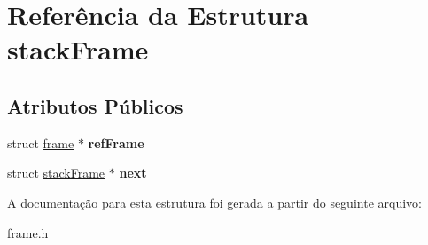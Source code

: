 \hypertarget{structstackFrame}{\section{Referência da Estrutura stack\-Frame}
\label{structstackFrame}
}
\subsection*{Atributos Públicos}
\begin{DoxyCompactItemize}
\item 
\hypertarget{structstackFrame_ac37e8750f94dd789e68064103a552b2a}{struct \hyperlink{structframe}{frame} $\ast$ {\bfseries ref\-Frame}}\label{structstackFrame_ac37e8750f94dd789e68064103a552b2a}

\item 
\hypertarget{structstackFrame_ae23c22c5fd9960b731bc85ed04c0580d}{struct \hyperlink{structstackFrame}{stack\-Frame} $\ast$ {\bfseries next}}\label{structstackFrame_ae23c22c5fd9960b731bc85ed04c0580d}

\end{DoxyCompactItemize}


A documentação para esta estrutura foi gerada a partir do seguinte arquivo\-:\begin{DoxyCompactItemize}
\item 
frame.\-h\end{DoxyCompactItemize}
